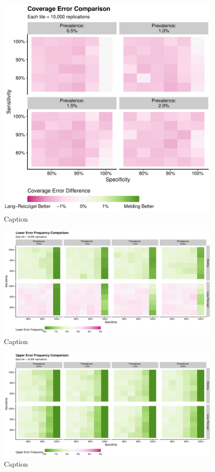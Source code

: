 \documentclass[AMA,STIX1COL]{WileyNJD-v2}
\begin{document}
\begin{figure}
\centering
\includegraphics[width=\textwidth]{figures/simple_coverage_error_comparison_plot.pdf}
\caption{Caption}
\label{fig:simple_coverage_error_comparison_plot}
\end{figure}

\begin{figure}
\centering
\includegraphics[width=\textwidth]{figures/simple_lower_error_frequency_comparison_plot.pdf}
\caption{Caption}
\label{fig:simple_lower_error_frequency_comparison_plot}
\end{figure}

\begin{figure}
\centering
\includegraphics[width=\textwidth]{figures/simple_upper_error_frequency_comparison_plot.pdf}
\caption{Caption}
\label{fig:simple_upper_error_frequency_comparison_plot}
\end{figure}
\end{document}
